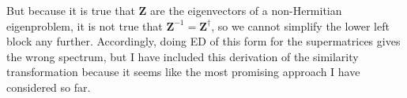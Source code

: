 But because it is true that $\bm{Z}$ are the eigenvectors of a non-Hermitian eigenproblem, it is not true that $\bm{Z}^{-1} = \bm{Z}^{\dagger}$, so we cannot simplify the lower left block any further.
Accordingly, doing ED of this form for the supermatrices gives the wrong spectrum, but I have included this derivation of the similarity transformation because it seems like the most promising approach I have considered so far.

